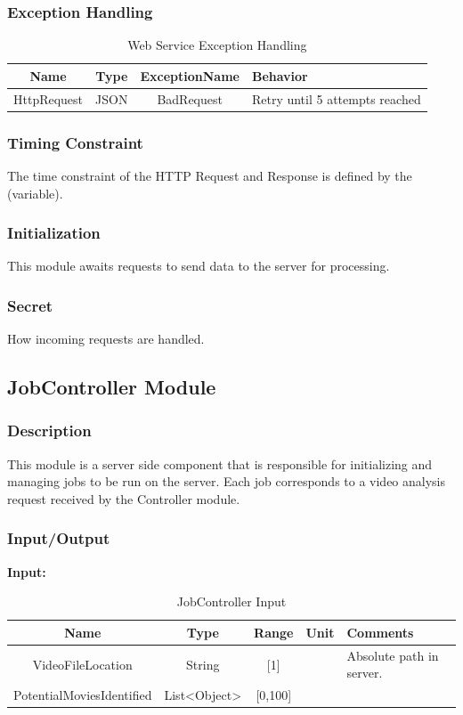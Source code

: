 \documentclass{article}
\begin{document}
\subsubsection{Exception Handling}
\begin{table}[H]
    \caption{Web Service Exception Handling}
    \centering
    \begin{tabularx}{0.7\textwidth}{|c|c|c|X|} \hline
        \textbf{Name} & \textbf{Type} & \textbf{ExceptionName} & \textbf{Behavior} \\ \hline
        HttpRequest & JSON & BadRequest & Retry until 5 attempts reached \\ \hline
    \end{tabularx}
    \label{tab:Web_Service_Exception}
\end{table}

\subsubsection{Timing Constraint}
The time constraint of the HTTP Request and Response is defined by the (variable).

\subsubsection{Initialization}
This module awaits requests to send data to the server for processing.

\subsubsection{Secret}
How incoming requests are handled.

\subsection{JobController Module}

\subsubsection{Description}
This module is a server side component that is responsible for initializing and managing jobs to be run on the server. Each job corresponds to a video analysis request received by the Controller module. 

\subsubsection{Input/Output}
\textbf{Input:}
\begin{table}[H]
    \caption{JobController Input}
    \centering
    \begin{tabularx}{0.7\textwidth}{|c|c|c|c|X|} \hline
        \textbf{Name} & \textbf{Type} & \textbf{Range} & \textbf{Unit} & \textbf{Comments} \\ \hline
        VideoFileLocation & String & [1] & & Absolute path in server.\\ \hline
        PotentialMoviesIdentified & List<Object> & [0,100] & & \\ \hline
    \end{tabularx}
    \label{tab:JobController_Input}
\end{table}
\end{document}
